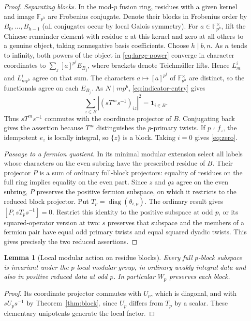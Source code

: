 \documentclass[11pt,a4paper]{article}
\numberwithin{equation}{section}
\newtheorem{lemma}[theorem]{Lemma}
\theoremstyle{remark}
\begin{document}
\begin{proof}
\emph{Separating blocks.}
In the mod-$p$ fusion ring, residues with a given kernel and image
$\mathbb F_{p^h}$ are Frobenius conjugate. Denote their blocks
in Frobenius order by $B_0,\ldots,B_{h-1}$ (all conjugates occur
by local Galois symmetry). For $a\in\mathbb F_{p^h}^{\times}$,
lift the Chinese-remainder element with residue $a$ at this kernel
and zero at all others to a genuine object, taking nonnegative
basis coefficients. Choose $h\mid b,n$. As $n$ tends to infinity,
both powers of the object in \eqref{eq:large-power} converge in
character coordinates to $\sum_j[a]^{p^j}E_{B_j}$, where brackets
denote Teichm\"uller lifts. Hence $L_m^i$ and $L_{mp^b}^i$ agree
on that sum. The characters $a\mapsto[a]^{p^j}$ of
$\mathbb F_{p^h}^\times$ are distinct, so the functionals agree on
each $E_{B_j}$. As $N\mid mp^b$, \eqref{eq:indicator-entry} gives
\begin{equation}
 \sum_{z\in B}|(sT^ms^{-1})_{iz}|^2=\mathbf1_{i\in B}.
\end{equation}
Thus $sT^ms^{-1}$ commutes with the coordinate projector of $B$.
Conjugating back gives the assertion because $T^m$ distinguishes
the $p$-primary twists. If $p\nmid f_z$, the idempotent $e_z$
is locally integral, so $\{z\}$ is a block. Taking $i=0$ gives
\eqref{eq:zero}.

\emph{Passage to a fermion quotient.}
In its minimal modular extension select all labels whose characters
on the even subring have the prescribed residue of $B$. Their
projector $P$ is a sum of ordinary full-block projectors: equality of
residues on the full ring implies equality on the even part. Since
$z$ and $gz$ agree on the even subring, $P$ preserves the positive
fermion subspace, on which it restricts to the reduced block
projector. Put $T_p=\operatorname{diag}(\theta_{i,p})$. The ordinary
result gives $[P,sT_ps^{-1}]=0$. Restrict this identity to the
positive subspace at odd $p$, or its squared-operator version at
two: $s$ preserves that subspace and the members of a fermion pair
have equal odd primary twists and equal squared dyadic twists.
This gives precisely the two reduced assertions.
\end{proof}

\begin{lemma}[Local modular action on residue blocks]\label{lem:local-block-invariance}
Every full $p$-block subspace is invariant under the $p$-local
modular group, in ordinary weakly integral data and also in
positive reduced data at odd $p$. In particular $W_p$ preserves
each block.
\end{lemma}
\begin{proof}
Its coordinate projector commutes with $U_p$, which is diagonal,
and with $sU_ps^{-1}$ by Theorem~\ref{thm:block}, since $U_p$
differs from $T_p$ by a scalar. These elementary unipotents
generate the local factor.
\end{proof}
\end{document}
